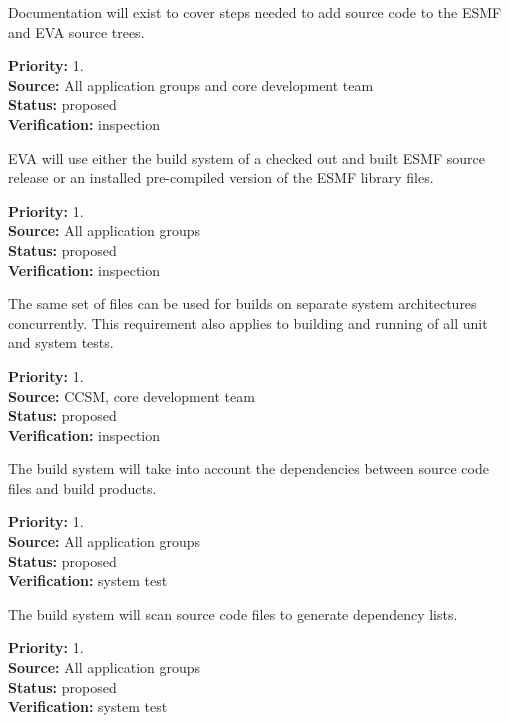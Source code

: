 Documentation will exist to cover steps needed to add source
code to the ESMF and EVA source trees.
\begin{reqlist}
{\bf Priority:} 1. \\
{\bf Source:} All application groups and core development team \\
{\bf Status:} proposed \\
{\bf Verification:} inspection
\end{reqlist}

EVA will use either the build system
of a checked out and built  ESMF source release or 
an installed pre-compiled version of the ESMF library files.
\begin{reqlist}
{\bf Priority:} 1. \\
{\bf Source:} All application groups \\
{\bf Status:} proposed \\
{\bf Verification:} inspection
\end{reqlist}


The same set of files can be used for builds on separate 
system architectures concurrently.  This requirement also
applies to building and running of all unit and system
tests.
\begin{reqlist}
{\bf Priority:} 1. \\
{\bf Source:} CCSM, core development team \\
{\bf Status:} proposed \\
{\bf Verification:} inspection
\end{reqlist}

The build system will take into account the dependencies 
between source code files and build products.  
\begin{reqlist}
{\bf Priority:} 1. \\
{\bf Source:} All application groups \\
{\bf Status:} proposed \\
{\bf Verification:} system test
\end{reqlist}

The build system will scan source code files to 
generate dependency lists.
\begin{reqlist}
{\bf Priority:} 1. \\
{\bf Source:} All application groups \\
{\bf Status:} proposed \\
{\bf Verification:} system test
\end{reqlist}

